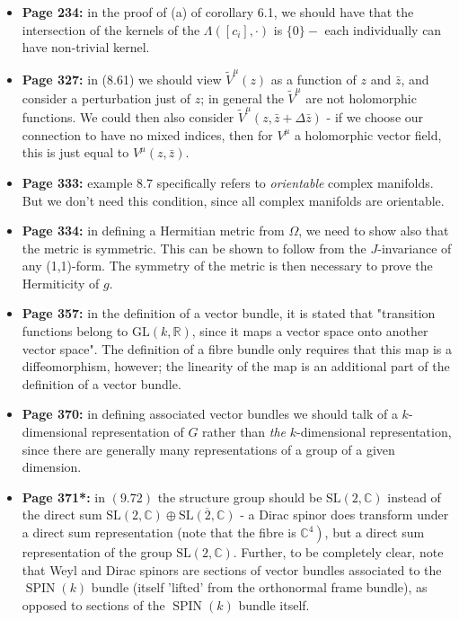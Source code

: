 \documentclass{article}
\begin{document}
\begin{itemize}
\item[] {\bf  Page 234:} in the proof of (a) of corollary 6.1, we should have that the intersection of the kernels of the $\Lambda\left(\left[c_{i}\right], \cdot\right)$ is $\{0\}-$ each individually can have non-trivial kernel.

\item[] {\bf  Page 327:} in (8.61) we should view $\tilde{V}^{\mu}(z)$ as a function of $z$ and $\bar{z}$, and consider a perturbation just of $z$; in general the $\tilde{V}^{\mu}$ are not holomorphic functions. We could then also consider $\tilde{V}^{\mu}(z, \bar{z}+\Delta \bar{z})$ - if we choose our connection to have no mixed indices, then for $V^{\mu}$ a holomorphic vector field, this is just equal to $V^{\mu}(z, \bar{z})$.

\item[] {\bf  Page 333:} example $8.7$ specifically refers to \emph{orientable} complex manifolds. But we don't need this condition, since all complex manifolds are orientable.

\item[] {\bf  Page 334:} in defining a Hermitian metric from $\Omega$, we need to show also that the metric is symmetric. This can be shown to follow from the $J$-invariance of any (1,1)-form. The symmetry of the metric is then necessary to prove the Hermiticity of $g$.

\item[] {\bf  Page 357:} in the definition of a vector bundle, it is stated that "transition functions belong to $\mathrm{GL}(k, \mathbb{R})$, since it maps a vector space onto another vector space". The definition of a fibre bundle only requires that this map is a diffeomorphism, however; the linearity of the map is an additional part of the definition of a vector bundle.

\item[] {\bf  Page 370:} in defining associated vector bundles we should talk of a $k$-dimensional representation of $G$ rather than \emph{the} $k$-dimensional representation, since there are generally many representations of a group of a given dimension.

  \item[] {\bf Page 371*:} in $(9.72)$ the structure group should be $\mathrm{SL}(2, \mathbb{C})$ instead of the direct sum $\mathrm{SL}(2, \mathbb{C}) \oplus \overline{\mathrm{SL}(2, \mathbb{C})}$ - a Dirac spinor does transform under a direct sum representation (note that the fibre is $\left.\mathbb{C}^{4}\right)$, but a direct sum representation of the group $\mathrm{SL}(2, \mathbb{C})$. Further, to be completely clear, note that Weyl and Dirac spinors are sections of vector bundles associated to the $\operatorname{SPIN}(k)$ bundle (itself 'lifted' from the orthonormal frame bundle), as opposed to sections of the $\operatorname{SPIN}(k)$ bundle itself.


\end{itemize}
\end{document}
